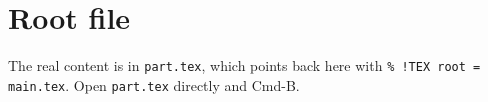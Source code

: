 \documentclass{article}
\begin{document}
\section{Root file}
The real content is in \texttt{part.tex}, which points back here with
\verb|% !TEX root = main.tex|. Open \texttt{part.tex} directly and Cmd-B.

\end{document}
